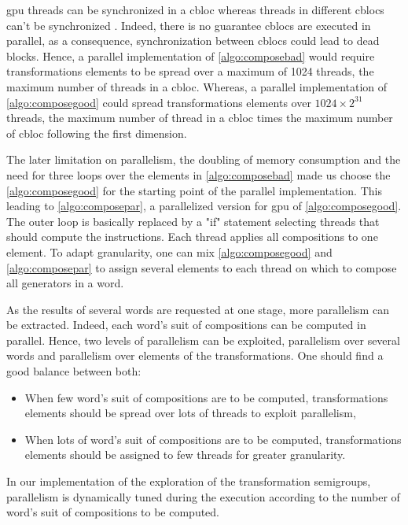 {\gls{gpu} threads can be synchronized in a \gls{cbloc} whereas threads in different \glspl{cbloc} can't be synchronized \cite{doccuda}. 
Indeed, there is no guarantee \glspl{cbloc} are executed in parallel, as a consequence, synchronization between \glspl{cbloc} could lead to dead blocks. 
Hence, a parallel implementation of \autoref{algo:composebad} would require transformations elements to be spread over a maximum of 1024 threads, the maximum number of threads in a \gls{cbloc}.
Whereas, a parallel implementation of \autoref{algo:composegood} could spread transformations elements over $1024 \times 2^31$ threads, 
the maximum number of thread in a \gls{cbloc} times the maximum number of \gls{cbloc} following the first dimension.

The later limitation on parallelism, the doubling of memory consumption and the need for three loops over the elements in \autoref{algo:composebad} 
made us choose the \autoref{algo:composegood} for the starting point of the parallel implementation. This leading to 
\autoref{algo:composepar}, a parallelized version for \gls{gpu} of \autoref{algo:composegood}. 
The outer loop is basically replaced by a "if" statement selecting threads that should compute the instructions. Each thread applies all compositions to one element.
To adapt granularity, one can mix \autoref{algo:composegood} and \autoref{algo:composepar} to assign several elements to each thread on which to compose all generators in a word.

As the results of several words are requested at one stage, more parallelism can be extracted. 
Indeed, each word's suit of compositions can be computed in parallel. 
Hence, two levels of parallelism can be exploited, parallelism over several words and parallelism over elements of the transformations. One should find a good balance between both:
\begin{itemize}
\item When few word's suit of compositions are to be computed, transformations elements should be spread over lots of threads to exploit parallelism,
\item When lots of word's suit of compositions are to be computed, transformations elements should be assigned to few threads for greater granularity.
\end{itemize}

In our implementation of the exploration of the transformation semigroups, parallelism is dynamically tuned during the execution according to the number of word's suit of compositions to be computed.



}
